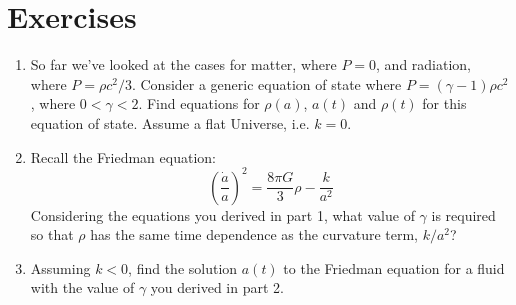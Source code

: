 \documentclass[]{book}
\begin{document}
\section{Exercises}\label{sec:composition_ex}

\begin{enumerate}
\def\labelenumi{\arabic{enumi}.}
\item
  So far we've looked at the cases for matter, where \(P = 0\), and
  radiation, where \(P = \rho c^2 / 3\). Consider a generic equation of
  state where \(P = (\gamma - 1) \rho c^2\), where \(0 < \gamma < 2\).
  Find equations for \(\rho(a)\), \(a(t)\) and \(\rho(t)\) for this
  equation of state. Assume a flat Universe, i.e. \(k=0\).
\item
  Recall the Friedman equation:
  \[\left(\dfrac{\dot{a}}{a}\right)^2 = \dfrac{8\pi G}{3}\rho - \dfrac{k}{a^2}\]
  Considering the equations you derived in part 1, what value of
  \(\gamma\) is required so that \(\rho\) has the same time dependence
  as the curvature term, \(k/a^2\)?
\item
  Assuming \(k<0\), find the solution \(a(t)\) to the Friedman equation
  for a fluid with the value of \(\gamma\) you derived in part 2.
\end{enumerate}


\end{document}
